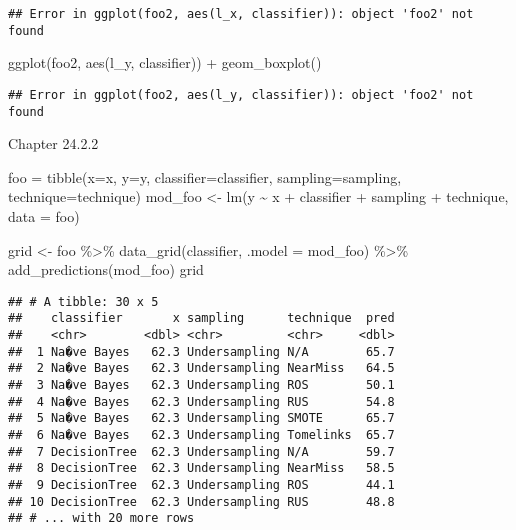 \documentclass[
]{article}
\newenvironment{Shaded}{\begin{snugshade}}{\end{snugshade}}
\newcommand{\AttributeTok}[1]{\textcolor[rgb]{0.77,0.63,0.00}{#1}}
\newcommand{\FunctionTok}[1]{\textcolor[rgb]{0.00,0.00,0.00}{#1}}
\newcommand{\NormalTok}[1]{#1}
\newcommand{\OtherTok}[1]{\textcolor[rgb]{0.56,0.35,0.01}{#1}}
\newcommand{\SpecialCharTok}[1]{\textcolor[rgb]{0.00,0.00,0.00}{#1}}
\begin{document}
\begin{verbatim}
## Error in ggplot(foo2, aes(l_x, classifier)): object 'foo2' not found
\end{verbatim}

\begin{Shaded}
\begin{Highlighting}[]
\FunctionTok{ggplot}\NormalTok{(foo2, }\FunctionTok{aes}\NormalTok{(l\_y, classifier)) }\SpecialCharTok{+} \FunctionTok{geom\_boxplot}\NormalTok{()}
\end{Highlighting}
\end{Shaded}

\begin{verbatim}
## Error in ggplot(foo2, aes(l_y, classifier)): object 'foo2' not found
\end{verbatim}

Chapter 24.2.2

\begin{Shaded}
\begin{Highlighting}[]
\NormalTok{ foo }\OtherTok{=} \FunctionTok{tibble}\NormalTok{(}\AttributeTok{x=}\NormalTok{x, }\AttributeTok{y=}\NormalTok{y, }\AttributeTok{classifier=}\NormalTok{classifier, }\AttributeTok{sampling=}\NormalTok{sampling, }\AttributeTok{technique=}\NormalTok{technique)}
\NormalTok{ mod\_foo }\OtherTok{\textless{}{-}} \FunctionTok{lm}\NormalTok{(y }\SpecialCharTok{\textasciitilde{}}\NormalTok{ x }\SpecialCharTok{+}\NormalTok{ classifier }\SpecialCharTok{+}\NormalTok{ sampling }\SpecialCharTok{+}\NormalTok{ technique, }\AttributeTok{data =}\NormalTok{ foo)}

\NormalTok{grid }\OtherTok{\textless{}{-}}\NormalTok{ foo }\SpecialCharTok{\%\textgreater{}\%} 
  \FunctionTok{data\_grid}\NormalTok{(classifier, }\AttributeTok{.model =}\NormalTok{ mod\_foo) }\SpecialCharTok{\%\textgreater{}\%} 
  \FunctionTok{add\_predictions}\NormalTok{(mod\_foo) }
\NormalTok{grid}
\end{Highlighting}
\end{Shaded}

\begin{verbatim}
## # A tibble: 30 x 5
##    classifier       x sampling      technique  pred
##    <chr>        <dbl> <chr>         <chr>     <dbl>
##  1 Na�ve Bayes   62.3 Undersampling N/A        65.7
##  2 Na�ve Bayes   62.3 Undersampling NearMiss   64.5
##  3 Na�ve Bayes   62.3 Undersampling ROS        50.1
##  4 Na�ve Bayes   62.3 Undersampling RUS        54.8
##  5 Na�ve Bayes   62.3 Undersampling SMOTE      65.7
##  6 Na�ve Bayes   62.3 Undersampling Tomelinks  65.7
##  7 DecisionTree  62.3 Undersampling N/A        59.7
##  8 DecisionTree  62.3 Undersampling NearMiss   58.5
##  9 DecisionTree  62.3 Undersampling ROS        44.1
## 10 DecisionTree  62.3 Undersampling RUS        48.8
## # ... with 20 more rows
\end{verbatim}
\end{document}
